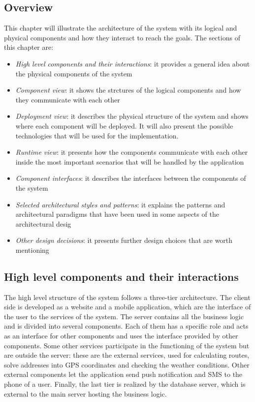 
\subsection{Overview}

This chapter will illustrate the architecture of the system with its logical and physical components and how they interact to reach the goals. The sections of this chapter are:
\begin{itemize}
	\item \emph{High level components and their interactions}: it provides a general idea about the physical components of the system
	\item \emph{Component view}: it shows the strctures of the logical components and how they communicate with each other
	\item \emph{Deployment view}: it describes the physical structure of the system and shows where each component will be deployed. It will also present the possible technologies that will be used for the implementation.
	\item \emph{Runtime view}: it presents how the components communicate with each other inside the most important scenarios that will be handled by the application
	\item \emph{Component interfaces}: it describes the interfaces between the components of the system
	\item \emph{Selected architectural styles and patterns}: it explains the patterns and architectural paradigms that have been used in some aspects of the architectural desig
	\item \emph{Other design decisions}: it presents further design choices that are worth mentioning
\end{itemize}

\subsection{High level components and their interactions}

The high level structure of the system follows a three-tier architecture. The client side is developed as a website and a mobile application, which are the interface of the user to the services of the system. The server contains all the business logic and is divided into several components. Each of them has a specific role and acts as an interface for other components and uses the interface provided by other components. Some other services participate in the functioning of the system but are outside the server: these are the external services, used for calculating routes, solve addresses into GPS coordinates and checking the weather conditions. Other external components let the application send push notification and SMS to the phone of a user. Finally, the last tier is realized by the database server, which is external to the main server hosting the business logic.

